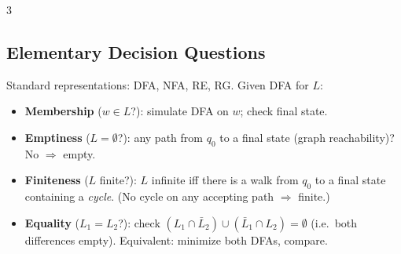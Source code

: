 \documentclass[9pt,a4paper,landscape]{extarticle}
\begin{document}
\begin{multicols*}{3}
\subsection{Elementary Decision Questions}
Standard representations: DFA, NFA, RE, RG. Given DFA for $L$:
\begin{itemize}
\item \textbf{Membership} ($w\in L$?): simulate DFA on $w$; check final state.
\item \textbf{Emptiness} ($L=\emptyset$?): any path from $q_0$ to a final state (graph reachability)? No $\Rightarrow$ empty.
\item \textbf{Finiteness} ($L$ finite?): $L$ infinite iff there is a walk from $q_0$ to a final state containing a \emph{cycle}. (No cycle on any accepting path $\Rightarrow$ finite.)
\item \textbf{Equality} ($L_1=L_2$?): check $(L_1\cap\bar L_2)\cup(\bar L_1\cap L_2)=\emptyset$ (i.e.\ both differences empty). Equivalent: minimize both DFAs, compare.
\end{itemize}


\end{multicols*}
\end{document}
